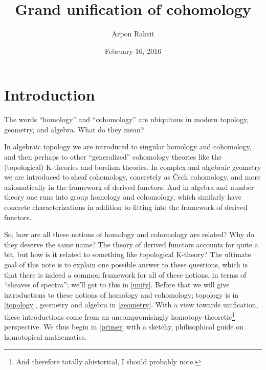 

\title{Grand unification of cohomology}
\author{Arpon Raksit}
\date{February 16, 2016}

\addtocounter{section}{-1}


\maketitle


\newcommand{\AbGroups}{\mathrm{AbGroups}}
\newcommand{\fin}{\mathrm{fin}}
\newcommand{\Ho}{\operatorname{Ho}}
\newcommand{\Push}{\operatorname{Push}}
\newcommand{\sing}{\mathrm{sing}}
\newcommand{\Spaces}{\mathrm{Spaces}}


\section{Introduction}

The words ``homology'' and ``cohomology'' are ubiquitous in modern topology, geometry, and algebra. What do they mean?

In algebraic topology we are introduced to singular homology and cohomology, and then perhaps to other ``generalized'' cohomology theories like the (topological) K-theories and bordism theories. In complex and algebraic geometry we are introduced to sheaf cohomology, concretely as \v{C}ech cohomology, and more axiomatically in the framework of derived functors. And in algebra and number theory one runs into group homology and cohomology, which similarly have concrete characterizations in addition to fitting into the framework of derived functors.

So, how are all these notions of homology and cohomology are related? Why do they deserve the same name? The theory of derived functors accounts for quite a bit, but how is it related to something like topological K-theory? The ultimate goal of this note is to explain one possible answer to these questions, which is that there is indeed a common framework for all of these notions, in terms of ``sheaves of spectra''; we'll get to this in \cref{unify}. Before that we will give introductions to these notions of homology and cohomology; topology is in \cref{topology}, geometry and algebra in \cref{geometry}. With a view towards unification, these introductions come from an uncompromisingly homotopy-theoretic\footnote{And therefore totally ahistorical, I should probably note.} perspective. We thus begin in \cref{primer} with a sketchy, philisophical guide on homotopical mathematics.


